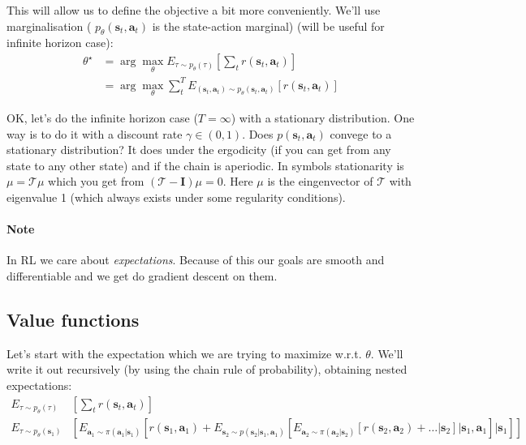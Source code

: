 \documentclass{report}
\newcommand{\argmax}{\arg\!\max}
\begin{document}
This will allow us to define the objective a bit more conveniently.
We'll use marginalisation ( $p_\theta (\bm{s}_t, \bm{a}_t)$ is the state-action marginal) (will be useful for infinite horizon case):
\begin{align}
		\theta^\star &= \argmax_{\theta} E_{\tau \sim p_\theta(\tau)} \left[ \sum_{t}^{} r(\bm{s}_t, \bm{a}_t) \right] \\
	 &= \argmax_{\theta} \sum_{t}^{T} E_{(\bm{s}_t, \bm{a}_t) \sim p_\theta(\bm{s}_t, \bm{a}_t)} \left[  r(\bm{s}_t, \bm{a}_t) \right]
\end{align}

OK, let's do the infinite horizon case ($T = \infty $) with a stationary distribution.
One way is to do it with a discount rate $\gamma \in (0,1)$.
Does $p(\bm{s}_t, \bm{a}_t)$ convege to a stationary distribution?
It does under the ergodicity (if you can get from any state to any other state) and if the chain is aperiodic.
In symbols stationarity is $\mu = \mathcal{T}\mu$ which you get from $(\mathcal{T} - \bm{I})\mu = 0$.
Here $\mu$ is the eingenvector of $\mathcal{T}$ with eigenvalue 1 (which always exists under some regularity conditions).
\paragraph{Note} In RL we care about \textit{expectations}.
Because of this our goals are smooth and differentiable and we get do gradient descent on them.

\subsection{Value functions}
Let's start with the expectation which we are trying to maximize w.r.t. $\theta$.
We'll write it out recursively (by using the chain rule of probability), obtaining nested expectations:
\begin{align}
		E_{\tau \sim p_\theta(\tau)} & \left[ \sum_{t}^{} r(\bm{s}_t, \bm{a}_t) \right] \\
		E_{\tau \sim p_\theta(\bm{s}_1)} & \left[ E_{\bm{a}_1 \sim \pi(\bm{a}_1|\bm{s}_1)}
		\left[ r(\bm{s}_1, \bm{a}_1) + E_{\bm{s}_2  \sim p(\bm{s}_2 | \bm{s}_1, \bm{a}_1)} 
\left [				E_{\bm{a}_2 \sim \pi(\bm{a}_2|\bm{s}_2)}
				\left[ r(\bm{s}_2, \bm{a}_2) + \dots | \bm{s}_2 \right] | \bm{s}_1, \bm{a}_1
\right] | \bm{s}_1  \right] \right ]
\end{align}
\end{document}
